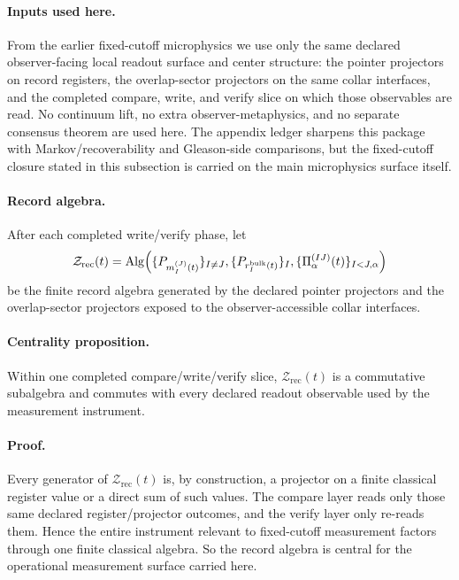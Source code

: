 \documentclass[11pt]{article}
\begin{document}
\paragraph{Inputs used here.}
From the earlier fixed-cutoff microphysics we use only the same declared observer-facing local
readout surface and center structure: the pointer projectors on record registers, the
overlap-sector projectors on the same collar interfaces, and the completed compare, write, and
verify slice on which those observables are read. No continuum lift, no extra
observer-metaphysics, and no separate consensus theorem are used here. The appendix ledger
sharpens this package with Markov/recoverability and Gleason-side comparisons, but the
fixed-cutoff closure stated in this subsection is carried on the main microphysics
surface itself.

\paragraph{Record algebra.}
After each completed write/verify phase, let
\begin{equation}
\mathcal Z_{\mathrm{rec}}(t)
=
\mathrm{Alg}\Bigl(
\{P_{m_I^{(J)}(t)}\}_{I\neq J},
\{P_{r_I^{\mathrm{bulk}}(t)}\}_I,
\{\Pi_\alpha^{(IJ)}(t)\}_{I<J,\alpha}
\Bigr)
\end{equation}
be the finite record algebra generated by the declared pointer projectors and the overlap-sector
projectors exposed to the observer-accessible collar interfaces.

\paragraph{Centrality proposition.}
Within one completed compare/write/verify slice, $\mathcal Z_{\mathrm{rec}}(t)$ is a commutative
subalgebra and commutes with every declared readout observable used by the measurement instrument.

\paragraph{Proof.}
Every generator of $\mathcal Z_{\mathrm{rec}}(t)$ is, by construction, a projector on a finite
classical register value or a direct sum of such values. The compare layer reads only those same
declared register/projector outcomes, and the verify layer only re-reads them. Hence the entire
instrument relevant to fixed-cutoff measurement factors through one finite classical algebra. So
the record algebra is central for the operational measurement surface carried here.
\end{document}
